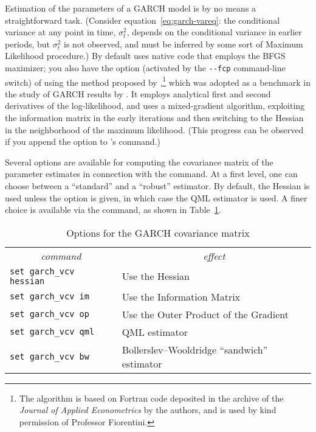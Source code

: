 Estimation of the parameters of a GARCH model is by no means a
straightforward task.  (Consider equation~\ref{eq:garch-vareq}: the
conditional variance at any point in time, $\sigma^2_t$, depends on
the conditional variance in earlier periods, but $\sigma^2_t$ is not
observed, and must be inferred by some sort of Maximum Likelihood
procedure.)  By default  uses native code that employs the
BFGS maximizer; you also have the option (activated by the
\verb|--fcp| command-line switch) of using the method proposed by
\cite{fiorentini96},\footnote{The algorithm is based on Fortran code
  deposited in the archive of the \textit{Journal of Applied
    Econometrics} by the authors, and is used by kind permission of
  Professor Fiorentini.} which was adopted as a benchmark in the study
of GARCH results by \cite{mccullough98}.  It employs analytical first
and second derivatives of the log-likelihood, and uses a
mixed-gradient algorithm, exploiting the information matrix in the
early iterations and then switching to the Hessian in the neighborhood
of the maximum likelihood.  (This progress can be observed if you
append the  option to 's 
command.)

Several options are available for computing the covariance matrix of
the parameter estimates in connection with the  command.
At a first level, one can choose between a ``standard'' and a
``robust'' estimator.  By default, the Hessian is used unless the
 option is given, in which case the QML estimator is
used.  A finer choice is available via the  command, as
shown in Table~\ref{tab:garch-vcv}.

\begin{table}[htbp]
\caption{Options for the GARCH covariance matrix}
\label{tab:garch-vcv}
\begin{center}
\begin{tabular}{ll}
\multicolumn{1}{c}{\textit{command}} &
\multicolumn{1}{c}{\textit{effect}} \\ [4pt]
\texttt{set garch\_vcv hessian} & Use the Hessian \\
\texttt{set garch\_vcv im} & Use the Information Matrix \\
\texttt{set garch\_vcv op} & Use the Outer Product of the Gradient \\
\texttt{set garch\_vcv qml} & QML estimator \\
\texttt{set garch\_vcv bw} & Bollerslev--Wooldridge ``sandwich'' estimator
\end{tabular}
\end{center}
\end{table}

